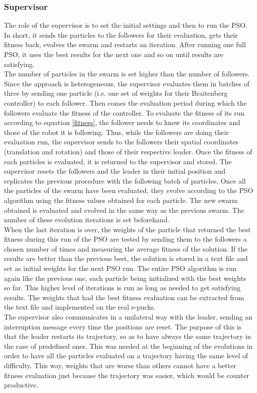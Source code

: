 \documentclass[a4, 10 pt, conference]{ieeeconf}  %
\begin{document}
\subsubsection{Supervisor}
The role of the supervisor is to set the initial settings and then to run the PSO. In short, it sends the particles to the followers for their evaluation, gets their fitness back, evolves the swarm and restarts an iteration. After running one full PSO, it uses the best results for the next one and so on until results are satisfying.\\
The number of particles in the swarm is set higher than the number of followers. Since the approach is heterogeneous, the supervisor evaluates them in batches of three by sending one particle (i.e. one set of weights for their Braitenberg controller) to each follower. Then comes the evaluation period during which the followers evaluate the fitness of the controller. To evaluate the fitness of its run according to equation \ref{fitness}, the follower needs to know its coordinates and those of the robot it is following. Thus, while the followers are doing their evaluation run, the supervisor sends to the followers their spatial coordinates (translation and rotation) and those of their respective leader. Once the fitness of each particles is evaluated, it is returned to the supervisor and stored. The supervisor resets the followers and the leader in their initial position and replicates the previous procedure with the following batch of particles. Once all the particles of the swarm have been evaluated, they evolve according to the PSO algorithm using the fitness values obtained for each particle. The new swarm obtained is evaluated  and evolved in the same way as the previous swarm. The number of these evolution iterations is set beforehand.\\
When the last iteration is over, the weights of the particle that returned the best fitness during this run of the PSO are tested by sending them to the followers a chosen number of times and measuring the average fitness of the solution. If the results are better than the previous best, the solution is stored in a text file and set as initial weights for the next PSO run. The entire PSO algorithm is run again like the previous one, each particle being initialized with the best weights so far. This higher level of iterations is run as long as needed to get satisfying results. The weights that had the best fitness evaluation can be extracted from the text file and implemented on the real e-pucks.\\
The supervisor also communicates in a unilateral way with the leader, sending an interruption message every time the positions are reset. The purpose of this is that the leader restarts its trajectory, so as to have always the same trajectory in the case of predefined ones. This was needed at the beginning of the evolutions in order to have all the particles evaluated on a trajectory having the same level of difficulty. This way, weights that are worse than others cannot have a better fitness evaluation just because the trajectory was easier, which would be counter productive.
\end{document}
